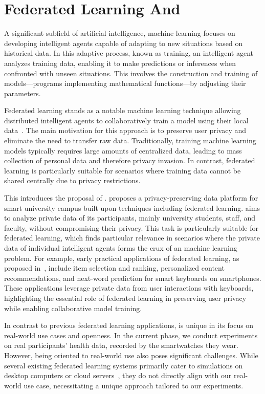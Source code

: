 \section{Federated Learning And \fedcampus}

A significant subfield of artificial intelligence,
machine learning focuses on developing intelligent agents capable of adapting to
new situations based on historical data. In this adaptive process,
known as training, an intelligent agent analyzes training data,
enabling it to make predictions or inferences when confronted with unseen
situations.
This involves the construction and training of models—programs implementing
mathematical functions—by adjusting their parameters.

Federated learning
stands as a notable machine learning technique allowing distributed intelligent
agents to collaboratively train a model using their local
data~\cite{mcmahan2017communication,yang2019federated}.
The main motivation for this approach is to preserve user privacy and eliminate
the need to transfer raw data. Traditionally,
training machine learning models typically requires large amounts of centralized
data,
leading to mass collection of personal data and therefore privacy invasion.
In contrast,
federated learning is particularly suitable for scenarios where training data
cannot be shared centrally due to privacy restrictions.

This introduces the proposal of \fedcampus.
\fedcampus proposes a privacy-preserving data platform for smart university
campus built upon techniques including federated learning.
\fedcampus aims to analyze private data of its participants,
mainly university students, staff, and faculty,
without compromising their privacy.
This task is particularly suitable for federated learning,
which finds particular relevance in scenarios where the private data of
individual intelligent agents forms the crux of an machine learning problem.
For example, early practical applications of federated learning,
as proposed in~\cite{bonawitz2019towards}, include item selection and ranking,
personalized content recommendations,
and next-word prediction for smart keyboards on smartphones.
These applications leverage private data from user interactions with keyboards,
highlighting the essential role of federated learning in preserving user privacy
while enabling collaborative model training.

In contrast to previous federated learning applications,
\fedcampus is unique in its focus on real-world use cases and openness.
In the current phase, we conduct experiments on real participants' health data,
recorded by the smartwatches they wear. However,
being oriented to real-world use also poses significant challenges.
While several existing federated learning systems primarily cater to simulations
on desktop computers or cloud
servers~\cite[e.g.,][]{bonawitz2019towards,tff,caldas2018leaf,ma2019paddlepaddle,liu2021fate,patrick2022openfl},
they do not directly align with our real-world use case,
necessitating a unique approach tailored to our experiments.

